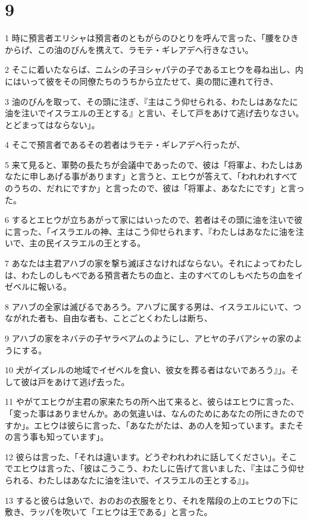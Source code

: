 \chapter{9}

\par 1 時に預言者エリシャは預言者のともがらのひとりを呼んで言った、「腰をひきからげ、この油のびんを携えて、ラモテ・ギレアデへ行きなさい。
\par 2 そこに着いたならば、ニムシの子ヨシャパテの子であるエヒウを尋ね出し、内にはいって彼をその同僚たちのうちから立たせて、奥の間に連れて行き、
\par 3 油のびんを取って、その頭に注ぎ、『主はこう仰せられる、わたしはあなたに油を注いでイスラエルの王とする』と言い、そして戸をあけて逃げ去りなさい。とどまってはならない」。
\par 4 そこで預言者であるその若者はラモテ・ギレアデへ行ったが、
\par 5 来て見ると、軍勢の長たちが会議中であったので、彼は「将軍よ、わたしはあなたに申しあげる事があります」と言うと、エヒウが答えて、「われわれすべてのうちの、だれにですか」と言ったので、彼は「将軍よ、あなたにです」と言った。
\par 6 するとエヒウが立ちあがって家にはいったので、若者はその頭に油を注いで彼に言った、「イスラエルの神、主はこう仰せられます、『わたしはあなたに油を注いで、主の民イスラエルの王とする。
\par 7 あなたは主君アハブの家を撃ち滅ぼさなければならない。それによってわたしは、わたしのしもべである預言者たちの血と、主のすべてのしもべたちの血をイゼベルに報いる。
\par 8 アハブの全家は滅びるであろう。アハブに属する男は、イスラエルにいて、つながれた者も、自由な者も、ことごとくわたしは断ち、
\par 9 アハブの家をネバテの子ヤラベアムのようにし、アヒヤの子バアシャの家のようにする。
\par 10 犬がイズレルの地域でイゼベルを食い、彼女を葬る者はないであろう』」。そして彼は戸をあけて逃げ去った。
\par 11 やがてエヒウが主君の家来たちの所へ出て来ると、彼らはエヒウに言った、「変った事はありませんか。あの気違いは、なんのためにあなたの所にきたのですか」。エヒウは彼らに言った、「あなたがたは、あの人を知っています。またその言う事も知っています」。
\par 12 彼らは言った、「それは違います。どうぞわれわれに話してください」。そこでエヒウは言った、「彼はこうこう、わたしに告げて言いました、『主はこう仰せられる、わたしはあなたに油を注いで、イスラエルの王とする』」。
\par 13 すると彼らは急いで、おのおの衣服をとり、それを階段の上のエヒウの下に敷き、ラッパを吹いて「エヒウは王である」と言った。
